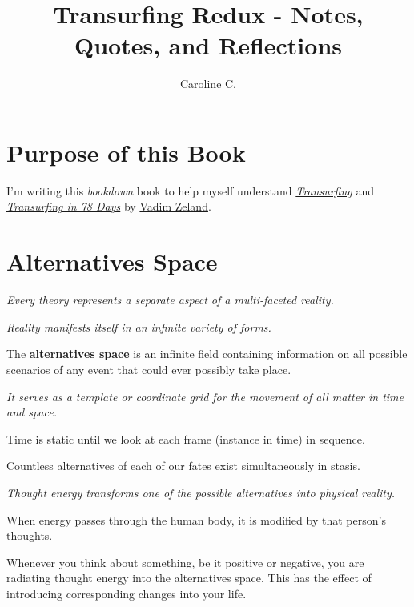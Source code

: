 \documentclass[
  openany]{book}
\title{Transurfing Redux - Notes, Quotes, and Reflections}
\author{Caroline C.}
\date{}
\begin{document}
\maketitle

{
\setcounter{tocdepth}{1}
\tableofcontents
}
\hypertarget{purpose-of-this-book}{%
\chapter{Purpose of this Book}\label{purpose-of-this-book}}

I'm writing this \emph{bookdown} book to help myself understand \href{https://www.amazon.com/Reality-transurfing-Steps-Vadim-Zeland/dp/1532814658}{\emph{Transurfing}} and \href{https://www.amazon.com/Transurfing-78-Days-Practical-Creating/dp/5957334715/ref=pd_lpo_1?pd_rd_i=5957334715\&psc=1}{\emph{Transurfing in 78 Days}} by \href{https://www.amazon.com/Vadim-Zeland/e/B00J0SESMY/ref=dp_byline_cont_pop_book_1}{Vadim Zeland}.

\hypertarget{alternatives-space}{%
\chapter{Alternatives Space}\label{alternatives-space}}

\emph{Every theory represents a separate aspect of a multi-faceted reality.}

\emph{Reality manifests itself in an infinite variety of forms.}

The \textbf{alternatives space} is an infinite field containing information on all possible scenarios of any event that could ever possibly take place.

\emph{It serves as a template or coordinate grid for the movement of all matter in time and space.}

Time is static until we look at each frame (instance in time) in sequence.

Countless alternatives of each of our fates exist simultaneously in stasis.

\emph{Thought energy transforms one of the possible alternatives into physical reality.}

When energy passes through the human body, it is modified by that person's thoughts.

Whenever you think about something, be it positive or negative, you are radiating thought energy into the alternatives space. This has the effect of introducing corresponding changes into your life.
\end{document}

